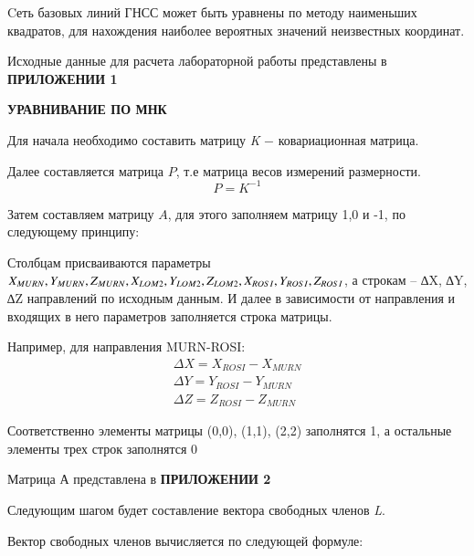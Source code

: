 \documentclass[a4paper]{article}
\begin{document}
\large{\par Cеть базовых линий ГНСС может быть уравнены по методу наименьших квадратов, для нахождения наиболее вероятных значений неизвестных координат.}
\large{\par Исходные данные для расчета лабораторной работы представлены в \textbf{ПРИЛОЖЕНИИ 1}}
\begin{newpage}
\begin{center}
    \large{\textbf{УРАВНИВАНИЕ ПО МНК}}
\end{center}
\par\large{Для начала необходимо составить матрицу \textit{K} $-$ ковариационная матрица.
\par Далее составляется матрица $P$, т.е матрица весов измерений размерности.
\begin{equation}
    P=K^{-1}
\end{equation}
\par Затем составляем матрицу $A$, для этого заполняем матрицу 1,0 и -1, по следующему принципу:
\par Столбцам присваиваются параметры $X_{MURN}, Y_{MURN}, Z_{MURN},\\
X_{LOM2}, Y_{LOM2}, Z_{LOM2}, X_{ROSI}, Y_{ROSI}, Z_{ROSI}$, а строкам – ∆X, ∆Y, ∆Z направлений по исходным данным. И
далее в зависимости от направления и входящих в него параметров заполняется
строка матрицы.
\par Например, для направления MURN-ROSI:
$$
    \begin{matrix}
    \Delta X = X_{ROSI}-X_{MURN}\\
    \Delta Y = Y_{ROSI}-Y_{MURN}\\
    \Delta Z = Z_{ROSI}-Z_{MURN}
\end{matrix}
$$
\par Соответственно элементы матрицы (0,0), (1,1), (2,2) заполнятся 1, а остальные элементы трех строк заполнятся 0}
\par Матрица А представлена в \textbf{ПРИЛОЖЕНИИ 2}
\par Следующим шагом будет составление вектора свободных членов \textit{L}.
\par Вектор свободных членов вычисляется по следующей формуле:
\end{newpage}
\end{document}
